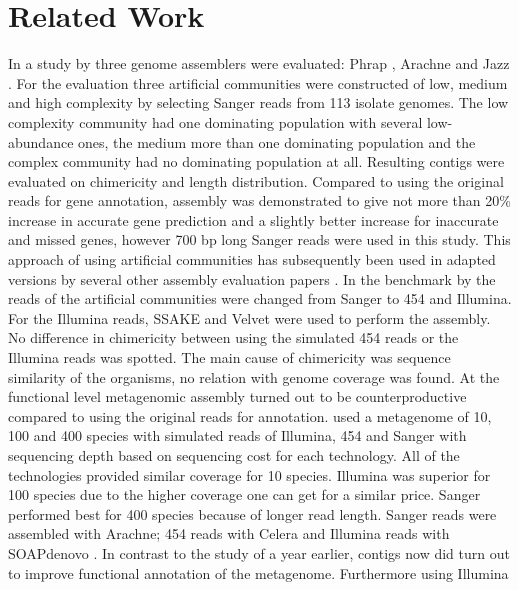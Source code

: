 \documentclass[a4paper,12pt]{report}
\begin{document}
\chapter{Related Work}

In a study by \citet{Mavromatis17468765} three genome assemblers were
evaluated: Phrap \cite{delaBastide18428783}, Arachne \cite{Batzoglou11779843}
and Jazz \cite{Aparicio12142439}. For the evaluation three artificial
communities were constructed of low, medium and high complexity by selecting
Sanger reads from 113 isolate genomes. The low complexity community had one
dominating population with several low-abundance ones, the medium more than one
dominating population and the complex community had no dominating population at
all. Resulting contigs were evaluated on chimericity and length distribution.
Compared to using the original reads for gene annotation, assembly was
demonstrated to give not more than 20\% increase in accurate gene prediction
and a slightly better increase for inaccurate and missed genes, however 700 bp
long Sanger reads were used in this study. This approach of using artificial
communities has subsequently been used in adapted versions by several other
assembly evaluation papers \cite{Pignatelli21625384,Mende22384016}. In the
benchmark by \citet{Pignatelli21625384} the reads of the artificial communities
were changed from Sanger to 454 and Illumina. For the Illumina reads, SSAKE
\cite{Warren17158514} and Velvet were used to perform the assembly.  No
difference in chimericity between using the simulated 454 reads or the Illumina
reads was spotted. The main cause of chimericity was sequence similarity of the
organisms, no relation with genome coverage was found. At the functional level
metagenomic assembly turned out to be counterproductive compared to using the
original reads for annotation. \citet{Mende22384016} used a metagenome of 10,
100 and 400 species with simulated reads of Illumina, 454 and Sanger with
sequencing depth based on sequencing cost for each technology. All of the
technologies provided similar coverage for 10 species. Illumina was superior
for 100 species due to the higher coverage one can get for a similar price.
Sanger performed best for 400 species because of longer read length. Sanger
reads were assembled with Arachne; 454 reads with Celera \cite{Myers10731133}
and Illumina reads with SOAPdenovo \cite{Li20019144}. In contrast to the study
of \citet{Pignatelli21625384} a year earlier, contigs now did turn out to
improve functional annotation of the metagenome. Furthermore using Illumina
\end{document}
